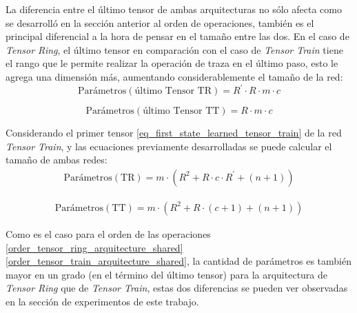 \documentclass[spanish]{article}
\theoremstyle{definition}
\theoremstyle{remark}
\numberwithin{equation}{section}
\numberwithin{equation}{section} %
\begin{document}
 La diferencia entre el último tensor de ambas arquitecturas no sólo afecta como se desarrolló en la sección anterior al orden de operaciones, también es el principal diferencial a la hora de pensar en el tamaño entre las dos.
 En el caso de \textit{Tensor Ring}, el último tensor en comparación con el caso de \textit{Tensor Train} tiene el rango que le permite realizar la operación de traza en el último paso, esto le agrega una dimensión más, aumentando considerablemente el tamaño de la red:   
 \begin{equation}
\label{last_tensor_ring_parameters}
\text{Parámetros}(\text{último Tensor TR})= R^{\prime} \cdot R \cdot m \cdot c 
\end{equation} \par \begin{equation}
\label{last_tensor_train_parameters}
\text{Parámetros}(\text{último Tensor TT})= R \cdot m \cdot c
\end{equation} \par
Considerando el primer tensor \eqref{eq_first_state_learned_tensor_train} de la red \textit{Tensor Train}, y las ecuaciones previamente desarrolladas se puede calcular el tamaño de ambas redes:
 \begin{equation}
\label{tensor_ring_parameters}
\begin{gathered}
\text{Parámetros}(\text{TR})=   m \cdot (R^2  + R \cdot c \cdot R^{\prime} + (n + 1))
\end{gathered}
\end{equation} \par \begin{equation}
\label{tensor_train_parameters}
\begin{gathered}
\text{Parámetros}(\text{TT})=   m \cdot (R^{2} + R \cdot (c + 1) + (n + 1))
\end{gathered}
\end{equation} \par
Como es el caso para el orden de las operaciones \eqref{order_tensor_ring_arquitecture_shared} \eqref{order_tensor_train_arquitecture_shared}, la cantidad de parámetros es también mayor en un grado (en el término del último tensor) para la arquitectura de \textit{Tensor Ring} que de \textit{Tensor Train}, estas dos diferencias se pueden ver observadas en la sección de experimentos de este trabajo.   

 \par

\clearpage
\end{document}
